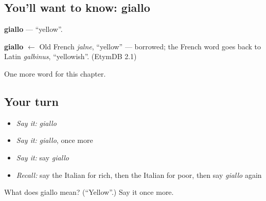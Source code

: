 \subsection*{You'll want to know: giallo}
\textbf{giallo} — \textquotedblleft{}yellow\textquotedblright{}.

\begin{cousinweb}
\textbf{giallo} $\leftarrow$ Old French \emph{jalne}, \textquotedblleft{}yellow\textquotedblright{} — borrowed; the French word goes back to Latin \emph{galbinus}, \textquotedblleft{}yellowish\textquotedblright{}. (EtymDB 2.1)
\end{cousinweb}

\begin{grammarlens}[title={What you've built}]
One more word for this chapter.
\end{grammarlens}

\subsection*{Your turn}
\begin{itemize}
\raggedright
  \item \emph{Say it:} \emph{giallo}
  \item \emph{Say it:} \emph{giallo}, once more
  \item \emph{Say it:} say \emph{giallo}
  \item \emph{Recall:} say the Italian for rich, then the Italian for poor, then say \emph{giallo} again
\end{itemize}

\begin{tcolorbox}[breakable,colback=teal!4,colframe=teal!35!black,title={Before you move on}]
What does giallo mean? (\textquotedblleft{}Yellow\textquotedblright{}.) Say it once more.
\end{tcolorbox}
